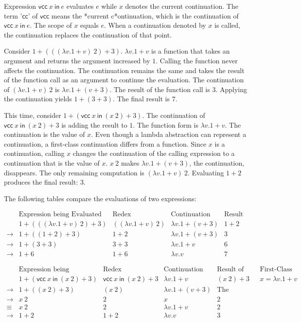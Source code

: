 Expression $\textsf{vcc}\ x\ \textsf{in}\ e$ evaluates $e$ while $x$ denotes the
current continuation. The term '$\textsf{cc}$' of $\textsf{vcc}$ means the
*current c*ontinuation, which is the continuation of $\textsf{vcc}\ x\
\textsf{in}\ e$. The scope of $x$ equals $e$. When a continuation denoted by $x$
is called, the continuation replaces the continuation of that point.

Consider $1+(((\lambda v.1+v)\ 2)+3)$. $\lambda v.1+v$ is a function that takes
an argument and returns the argument increased by $1$. Calling the function never
affects the continuation. The continuation remains the same and takes the result
of the function call as an argument to continue the evaluation. The continuation
of $(\lambda v.1+v)\ 2$ is $\lambda v.1+(v+3)$. The result of the function call
is $3$. Applying the continuation yields $1+(3+3)$. The final result is $7$.

This time, consider $1+(\textsf{vcc}\ x\ \textsf{in}\ (x\ 2)+3)$. The
continuation of $\textsf{vcc}\ x\ \textsf{in}\ (x\ 2)+3$ is adding the result to
$1$. The function form is $\lambda v.1+v$. The continuation is the value of $x$.
Even though a lambda abstraction can represent a continuation, a first-class
continuation differs from a function. Since $x$ is a continuation, calling $x$
changes the continuation of the calling expression to a continuation that is the
value of $x$. $x\ 2$ makes $\lambda v.1+(v+3)$, the continuation, disappears. The
only remaining computation is $(\lambda v.1+v)\ 2$. Evaluating $1+2$ produces the
final result: $3$.

The following tables compare the evaluations of two expressions:

\[
\begin{array}{ccccc}
&\text{Expression being Evaluated} & \text{Redex} & \text{Continuation} &
\text{Result of Redex} \\
& 1+(((\lambda v.1+v)\ 2)+3) & ((\lambda v.1+v)\ 2) & \lambda v.1+(v+3) & 1+2 \\
\rightarrow& 1+((1+2)+3) & 1+2 & \lambda v.1+(v+3) & 3 \\
\rightarrow&1+(3+3) & 3+3 & \lambda v.1+v & 6 \\
\rightarrow& 1+6 & 1+6 & \lambda v.v & 7
\end{array}
\]

\[
\begin{array}{cccccc}
&\text{Expression being Evaluated} & \text{Redex} & \text{Continuation} &
\text{Result of Redex} & \text{First-Class Continuation} \\
& 1+(\textsf{vcc}\ x\ \textsf{in}\ (x\ 2)+3) & \textsf{vcc}\ x\ \textsf{in}\ (x\
2)+3 & \lambda v.1+v & (x\ 2)+3 &        x=\lambda v.1+v \\
\rightarrow& 1+((x\ 2)+3) & (x\ 2) & \lambda v.1+(v+3) & \text{The continuation
changes}  \\
\rightarrow& x\ 2 & 2 & x & 2 \\
\equiv & x\ 2 & 2 & \lambda v.1+v & 2 \\
\rightarrow& 1+2 & 1+2 & \lambda v.v & 3
\end{array}
\]

